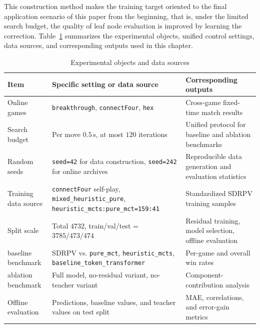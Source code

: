This construction method makes the training target oriented to the final application scenario of this paper from the beginning, that is, under the limited search budget, the quality of leaf node evaluation is improved by learning the correction.
Table~\ref{tab:experiment_objects_and_data_sources} summarizes the experimental objects, unified control settings, data sources, and corresponding outputs used in this chapter.



\begin{table}[htbp]
\centering
\caption{Experimental objects and data sources}
\label{tab:experiment_objects_and_data_sources}
\begin{tabular}{p{2.4cm}p{5.0cm}p{4.1cm}}
\toprule
Item & Specific setting or data source & Corresponding outputs \\
\midrule
Online games & \texttt{breakthrough}, \texttt{connectFour}, \texttt{hex} & Cross-game fixed-time match results \\
Search budget & Per move $0.5\,\mathrm{s}$, at most $120$ iterations & Unified protocol for baseline and ablation benchmarks \\
Random seeds & \texttt{seed=42} for data construction, \texttt{seed=242} for online archives & Reproducible data generation and evaluation statistics \\
Training data source & \texttt{connectFour} self-play, \texttt{mixed\_heuristic\_pure}, \texttt{heuristic\_mcts:pure\_mct=159:41} & Standardized SDRPV training samples \\
Split scale & Total $4732$, train/val/test = $3785/473/474$ & Residual training, model selection, offline evaluation \\
baseline benchmark & SDRPV vs. \texttt{pure\_mct}, \texttt{heuristic\_mcts}, \texttt{baseline\_token\_transformer} & Per-game and overall win rates \\
ablation benchmark & Full model, no-residual variant, no-teacher variant & Component-contribution analysis \\
Offline evaluation & Predictions, baseline values, and teacher values on test split & MAE, correlations, and error-gain metrics \\
\bottomrule
\end{tabular}
\end{table}

